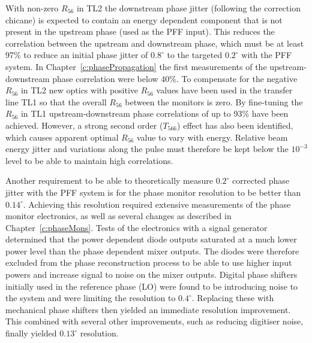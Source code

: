 With non-zero \(R_{56}\) in TL2 the downstream phase jitter (following the correction chicane) is expected to contain an energy dependent component that is not present in the upstream phase (used as the PFF input). This reduces the correlation between the upstream and downstream phase, which must be at least 97\% to reduce an initial phase jitter of \(0.8^\circ\) to the targeted \(0.2^\circ\) with the PFF system. In Chapter~\ref{c:phasePropagation} the first measurements of the upstream-downstream phase correlation were below 40\%. To compensate for the negative \(R_{56}\) in TL2 new optics with positive \(R_{56}\) values have been used in the transfer line TL1 so that the overall \(R_{56}\) between the monitors is zero. By fine-tuning the \(R_{56}\) in TL1 upstream-downstream phase correlations of up to 93\% have been achieved. However, a strong second order (\(T_{566}\)) effect has also been identified, which causes apparent optimal \(R_{56}\) value to vary with energy. Relative beam energy jitter and variations along the pulse must therefore be kept below the \(10^{-3}\) level to be able to maintain high correlations. 

Another requirement to be able to theoretically measure \(0.2^\circ\) corrected phase jitter with the PFF system is for the phase monitor resolution to be better than \(0.14^\circ\). Achieving this resolution required extensive measurements of the phase monitor electronics, as well as several changes as described in Chapter~\ref{c:phaseMons}. Tests of the electronics with a signal generator determined that the power dependent diode outputs saturated at a much lower power level than the phase dependent mixer outputs. The diodes were therefore excluded from the phase reconstruction process to be able to use higher input powers and increase signal to noise on the mixer outputs. Digital phase shifters initially used in the reference phase (LO) were found to be introducing noise to the system and were limiting the resolution to \(0.4^\circ\). Replacing these with mechanical phase shifters then yielded an immediate resolution improvement. This combined with several other improvements, such as reducing digitiser noise, finally yielded \(0.13^\circ\) resolution.

